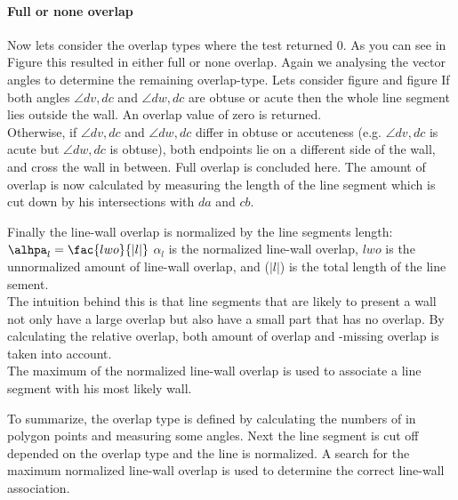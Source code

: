 \documentclass[10pt]{article}
\begin{document}
	\paragraph{Full or none overlap}
	Now lets consider the overlap types where the  test
	returned 0.
	As you can see in Figure %
	this resulted in either full or none overlap.
	Again we analysing the vector angles to determine the remaining overlap-type.
	Lets consider 
	figure %
	and figure %
	If both angles $\angle dv, dc$ and $\angle dw,dc$ are obtuse or acute
	then the whole line segment lies outside the wall. An overlap value of zero
	is returned.\\
	Otherwise, if $\angle dv, dc$ and $\angle dw,dc$ differ in obtuse or accuteness
	(e.g. $\angle dv, dc$ is acute but $\angle dw, dc$ is obtuse), 
	both endpoints lie on a different side of the wall, and cross the wall in
	between. Full overlap is concluded here. 
	The amount of overlap is now calculated by measuring the length
	of the line segment which is cut down by his intersections with $da$ and
	$cb$.
	
	Finally the line-wall overlap is normalized by the line segments length:\\
	$\alhpa_{l} = \fac{lwo}{|l|}$
	$\alpha_{l}$ is the normalized line-wall overlap, 
	$lwo$ is the unnormalized amount of line-wall overlap, 
	and ($|l|$) is the total length of the line sement.\\

	The intuition behind this is that line segments that are likely to
	present a wall not only have a large overlap but also have a small part
	that has no overlap. By calculating the relative overlap, both amount of overlap
	and -missing overlap is taken into account.\\

	The maximum of the normalized line-wall overlap is used to associate a
	line segment with his most likely wall.

	To summarize, the overlap type is defined by calculating the numbers of in
	polygon points and measuring some angles. Next the line segment is cut off
	depended on the overlap type and the line is normalized. A search for the
	maximum normalized line-wall overlap is used to determine the correct line-wall
	association.

	
\end{document}
